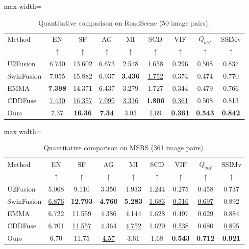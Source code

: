 \documentclass[a4paper,fleqn]{cas-dc}
\begin{document}
\begin{table}[htbp]
\centering
\caption{Quantitative comparison on RoadScene (50 image pairs).}
\label{tab:roadscene}
\begin{adjustbox}{max width=\columnwidth}
\begin{tabular}{@{}lcccccccc@{}}
\toprule
Method & EN & SF & AG & MI & SCD & VIF & $Q_{abf}$ & SSIMv \\
 & $\uparrow$ & $\uparrow$ & $\uparrow$ & $\uparrow$ & $\uparrow$
 & $\uparrow$ & $\uparrow$ & $\uparrow$ \\
\midrule
U2Fusion\cite{u2fusion2022}
  & 6.730 & 13.602 & 6.673 & 2.578 & 1.658 & 0.296 & \underline{0.508} & \underline{0.837} \\
SwinFusion\cite{swinfusion2022}
  & 7.055 & 15.882 & 6.937 & \textbf{3.436} & \underline{1.752}
  & 0.374 & 0.474 & 0.770 \\
EMMA\cite{emma2024}
  & \textbf{7.398} & 14.371 & 6.437 & 3.279 & 1.727 & 0.344 & 0.479 & 0.766 \\
CDDFuse\cite{cddfuse2023}
  & \underline{7.430} & \underline{16.357} & \underline{7.099} & \underline{3.316}
  & \textbf{1.806} & \underline{0.361} & 0.508 & 0.813 \\
\midrule
Ours
  & 7.37 & \textbf{16.36} & \textbf{7.34} & 3.05 & 1.69
  & \textbf{0.361} & \textbf{0.543} & \textbf{0.842} \\
\bottomrule
\end{tabular}
\end{adjustbox}
\end{table}

\begin{table}[htbp]
\centering
\caption{Quantitative comparison on MSRS (361 image pairs).}
\label{tab:msrs}
\begin{adjustbox}{max width=\columnwidth}
\begin{tabular}{@{}lcccccccc@{}}
\toprule
Method & EN & SF & AG & MI & SCD & VIF & $Q_{abf}$ & SSIMv \\
 & $\uparrow$ & $\uparrow$ & $\uparrow$ & $\uparrow$ & $\uparrow$
 & $\uparrow$ & $\uparrow$ & $\uparrow$ \\
\midrule
U2Fusion\cite{u2fusion2022}
  & 5.068 & 9.110 & 3.350 & 1.933 & 1.244 & 0.275 & 0.458 & 0.737 \\
SwinFusion\cite{swinfusion2022}
  & \underline{6.876} & \textbf{12.793} & \textbf{4.760} & \textbf{5.283}
  & \underline{1.683} & \underline{0.516} & \underline{0.697} & 0.892 \\
EMMA\cite{emma2024}
  & 6.722 & 11.559 & 4.386 & 4.144 & 1.628 & 0.497 & 0.629 & 0.884 \\
CDDFuse\cite{cddfuse2023}
  & 6.701 & \underline{11.557} & 4.364 & \underline{4.752} & 1.620
  & \underline{0.538} & 0.680 & \underline{0.895} \\
\midrule
Ours
  & 6.70 & 11.75 & \underline{4.57} & 3.61 & 1.68
  & \textbf{0.543} & \textbf{0.712} & \textbf{0.921} \\
\bottomrule
\end{tabular}
\end{adjustbox}
\end{table}
\end{document}
